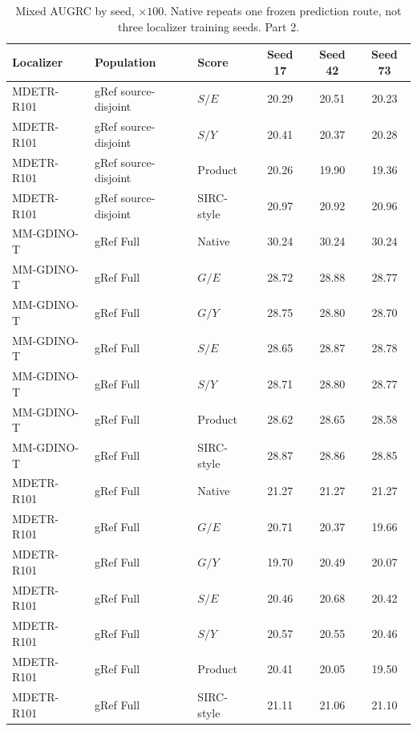 \begin{table}[t]
\centering\footnotesize
\setlength{\tabcolsep}{3pt}
\renewcommand{\arraystretch}{1.15}
\caption{Mixed AUGRC by seed, $\times100$. Native repeats one frozen prediction route, not three localizer training seeds. Part 2.}\label{tab:supp_v6_seed_endpoints_2}
\begin{tabular}{@{}lllccc@{}}\toprule
Localizer & Population & Score & Seed 17 & Seed 42 & Seed 73\\\midrule
MDETR-R101 & gRef source-disjoint & $S/E$ & 20.29 & 20.51 & 20.23\\
MDETR-R101 & gRef source-disjoint & $S/Y$ & 20.41 & 20.37 & 20.28\\
MDETR-R101 & gRef source-disjoint & Product & 20.26 & 19.90 & 19.36\\
MDETR-R101 & gRef source-disjoint & SIRC-style & 20.97 & 20.92 & 20.96\\
MM-GDINO-T & gRef Full & Native & 30.24 & 30.24 & 30.24\\
MM-GDINO-T & gRef Full & $G/E$ & 28.72 & 28.88 & 28.77\\
MM-GDINO-T & gRef Full & $G/Y$ & 28.75 & 28.80 & 28.70\\
MM-GDINO-T & gRef Full & $S/E$ & 28.65 & 28.87 & 28.78\\
MM-GDINO-T & gRef Full & $S/Y$ & 28.71 & 28.80 & 28.77\\
MM-GDINO-T & gRef Full & Product & 28.62 & 28.65 & 28.58\\
MM-GDINO-T & gRef Full & SIRC-style & 28.87 & 28.86 & 28.85\\
MDETR-R101 & gRef Full & Native & 21.27 & 21.27 & 21.27\\
MDETR-R101 & gRef Full & $G/E$ & 20.71 & 20.37 & 19.66\\
MDETR-R101 & gRef Full & $G/Y$ & 19.70 & 20.49 & 20.07\\
MDETR-R101 & gRef Full & $S/E$ & 20.46 & 20.68 & 20.42\\
MDETR-R101 & gRef Full & $S/Y$ & 20.57 & 20.55 & 20.46\\
MDETR-R101 & gRef Full & Product & 20.41 & 20.05 & 19.50\\
MDETR-R101 & gRef Full & SIRC-style & 21.11 & 21.06 & 21.10\\
\bottomrule\end{tabular}
\end{table}
